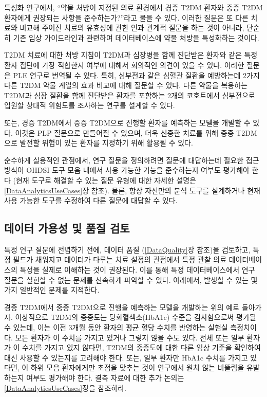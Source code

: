 \documentclass[10.5pt]{book}
\theoremstyle{definition}
\theoremstyle{definition}
\theoremstyle{definition}
\theoremstyle{remark}
\begin{document}
특성화 연구에서, ``약물 처방이 지정된 의료 환경에서 경증 T2DM 환자와
중증 T2DM 환자에게 권장되는 사항을 준수하는가?''라고 물을 수 있다.
이러한 질문은 또 다른 치료와 비교해 주어진 치료의 유효성에 관한 인과
관계적 질문을 하는 것이 아니라, 단순히 기존 임상 가이드라인과 관련하여
데이터베이스에 약물 처방을 특성화하는 것이다.

T2DM 치료에 대한 처방 지침이 T2DM과 심장병을 함께 진단받은 환자와 같은
특정 환자 집단에 가장 적합한지 여부에 대해서 회의적인 의견이 있을 수
있다. 이러한 질문은 PLE 연구로 번역될 수 있다. 특히, 심부전과 같은
심혈관 질환을 예방하는데 2가지 다른 T2DM 약물 계열의 효과 비교에 대해
질문할 수 있다. 다른 약물을 복용하는 T2DM과 심장 질환을 함께 진단받은
환자를 포함하는 2개의 코호트에서 심부전으로 입원할 상대적 위험도를
조사하는 연구를 설계할 수 있다.

또는, 경증 T2DM에서 중증 T2DM으로 진행할 환자를 예측하는 모델을 개발할
수 있다. 이것은 PLP 질문으로 만들어질 수 있으며, 더욱 신중한 치료를 위해
중증 T2DM으로 발전할 위험이 있는 환자를 지정하기 위해 활용될 수 있다.

순수하게 실용적인 관점에서, 연구 질문을 정의하려면 질문에 대답하는데
필요한 접근 방식이 OHDSI 도구 모음 내에서 사용 가능한 기능을 준수하는지
여부도 평가해야 한다 (현재 도구로 해결할 수 있는 질문 유형에 대한 자세한
설명은 \ref{DataAnalyticsUseCases}장 참조). 물론, 항상 자신만의 분석
도구를 설계하거나 현재 사용 가능한 도구를 수정하여 다른 질문에 대답할 수
있다.

\subsection{데이터 가용성 및 품질 검토}\label{----}

특정 연구 질문에 전념하기 전에, 데이터 품질 (\ref{DataQuality}장 참조)을
검토하고, 특정 필드가 채워지고 데이터가 다루는 치료 설정의 관점에서 특정
관찰 의료 데이터베이스의 특성을 실제로 이해하는 것이 권장된다. 이를 통해
특정 데이터베이스에서 연구 질문을 실현할 수 없는 문제를 신속하게 파악할
수 있다. 아래에서, 발생할 수 있는 몇 가지 일반적인 문제를 지적한다.

경증 T2DM에서 중증 T2DM으로 진행을 예측하는 모델을 개발하는 위의 예로
돌아가자. 이상적으로 T2DM의 중증도는 당화혈색소(HbA1c) 수준을
검사함으로써 평가될 수 있는데, 이는 이전 3개월 동안 환자의 평균 혈당
수치를 반영하는 실험실 측정치이다. 모든 환자가 이 수치를 가지고 있거나
그렇지 않을 수도 있다. 전체 또는 일부 환자가 이 수치를 가지고 있지
않다면, T2DM의 중증도에 대한 다른 임상 기준을 확인하여 대신 사용할 수
있는지를 고려해야 한다. 또는, 일부 환자만 HbA1c 수치를 가지고 있다면, 이
하위 모음 환자에게만 초점을 맞추는 것이 연구에서 원치 않는 비뚤림을
유발하는지 여부도 평가해야 한다. 결측 자료에 대한 추가 논의는
\ref{DataAnalyticsUseCases}장을 참조하라.
\end{document}
